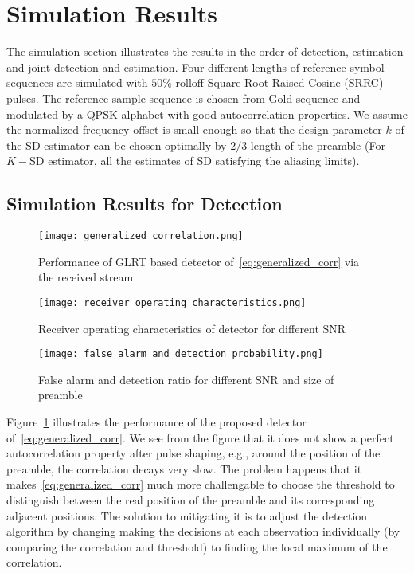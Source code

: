 \section{Simulation Results}%
\label{sec:simulations}

The simulation section illustrates the results in the order of detection, estimation and joint detection and estimation.
Four different lengths of reference symbol sequences are simulated with $50\%$ rolloff Square-Root Raised Cosine (SRRC) pulses.
The reference sample sequence is chosen from Gold sequence and modulated by a QPSK alphabet with good autocorrelation properties.
We assume the normalized frequency offset is small enough so that the design parameter $k$ of the SD estimator
can be chosen optimally by $2/3$ length of the preamble (For $K-$SD estimator, all the estimates of SD satisfying the aliasing limits). 

\subsection{Simulation Results for Detection}

\begin{figure}[t]
    \centerline{\texttt{[image: generalized\_correlation.png]}}
    \caption{Performance of GLRT based detector of~\eqref{eq:generalized_corr} via the received stream}
    \label{fig:Generalized correlation}
    \end{figure}

\begin{figure}[t]
    \centerline{\texttt{[image: receiver\_operating\_characteristics.png]}}
    \caption{Receiver operating characteristics of detector for different SNR}
    \label{fig:Receiver operating characteristics}
    \end{figure}

\begin{figure}[t]
    \centerline{\texttt{[image: false\_alarm\_and\_detection\_probability.png]}}
    \caption{False alarm and detection ratio for different SNR and size of preamble}
    \label{fig:False alarm and detection}
    \end{figure}

Figure~\ref{fig:Generalized correlation} illustrates the performance of the proposed detector of~\eqref{eq:generalized_corr}. 
We see from the figure that it does not show a perfect autocorrelation property after pulse shaping, e.g., around the position of the preamble, 
the correlation decays very slow. The problem happens that it makes~\eqref{eq:generalized_corr} much more challengable to choose the threshold to 
distinguish between the real position of the preamble and its corresponding adjacent positions. The solution to mitigating it is to 
adjust the detection algorithm by changing making the decisions at each observation individually (by comparing the correlation and threshold) to
finding the local maximum of the correlation.

